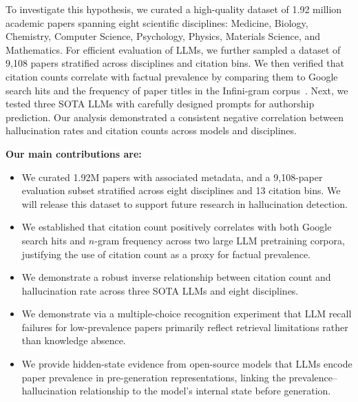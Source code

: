 \documentclass[11pt]{article}
\begin{document}
To investigate this hypothesis, we curated a high-quality dataset of 1.92 million academic papers spanning eight scientific disciplines: Medicine, Biology, Chemistry, Computer Science, Psychology, Physics, Materials Science, and Mathematics.
For efficient evaluation of LLMs, we further sampled a dataset of 9,108 papers stratified across disciplines and citation bins. We then verified that citation counts correlate with factual prevalence by comparing them to Google search hits and the frequency of paper titles in the Infini-gram corpus~\cite{Liu2024InfiniGram}. Next, we tested three SOTA LLMs with carefully designed prompts for authorship prediction. Our analysis
demonstrated a consistent negative correlation between hallucination rates and citation counts across models and disciplines.

\textbf{Our main contributions are:}

\begin{itemize}[
   leftmargin=1em,
    itemsep=0.2em,
    topsep=0.2em,
    partopsep=0em,
    parsep=0em
]
    \item
    We curated 1.92M papers with associated metadata, and a 9,108-paper evaluation subset stratified across eight disciplines and 13 citation bins.
    We will release this dataset to support future research in hallucination detection.

    \item
    We established that citation count positively correlates with both Google search hits and $n$-gram frequency across two large LLM pretraining corpora, justifying the use of citation count as a proxy for factual prevalence.

    \item
    We demonstrate a robust inverse relationship between citation count and hallucination rate across three SOTA LLMs and eight disciplines.

    \item We demonstrate via a multiple-choice recognition experiment that LLM recall failures for low-prevalence papers primarily reflect retrieval limitations rather than knowledge absence.

    \item We provide hidden-state evidence from open-source models that LLMs encode paper prevalence in pre-generation representations, linking the
    prevalence--hallucination relationship to the model's internal state before generation.

\end{itemize}
\end{document}
